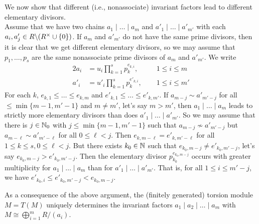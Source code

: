\documentclass[11pt]{book}
\theoremstyle{definition}   \newtheorem{defn}[counter]{Definition} %
\newcommand{\bs}{\backslash}   \newcommand{\A}{\mathcal{A}}   \newcommand{\sy}{\textnormal{Syl}}   \newcommand{\size}[1]{\left| #1 \right|}
\newcommand{\vs}{\vspace{8pt}}
\numberwithin{counter}{chapter}
\begin{document}
\begin{remark}[+ Discussion]
We now show that different (i.e., nonassociate) invariant factors lead to different elementary divisors. \\

Assume that we have two chains $a_1 \mid \dots \mid a_m$ and $a'_1 \mid \dots \mid a'_{m'}$ with each $a_i,a'_j \in R\bs(R\x \cup \{0\})$. If $a_m$ and $a'_{m'}$ do not have the same prime divisors, then it is clear that we get different elementary divisors, so we may assume that $p_1,\dots,p_s$ are the same nonassociate prime divisors of $a_m$ and $a'_{m'}$. We write
\begin{alignat*}{2}
a_i &= u_i \prod_{k=1}^s p_k ^{e_{k,i}}, \quad && 1 \leq i \leq m \\
a'_i &= u'_i \prod_{k=1}^s p_k^{e'_{k,i}}, && 1 \leq i \leq m'
\end{alignat*}
For each $k$, $e_{k,1} \leq \dots \leq e_{k,m}$ and $e'_{k,1} \leq \dots \leq e'_{k,m'}$. If $a_{m-j} \sim a'_{m'-j}$ for all $ \leq \min\{m-1,m'-1\}$ and $m \ne m'$, let's say $m > m'$, then $a_1 \mid \dots \mid a_m$ leads to strictly more elementary divisors than does $a'_1 \mid \dots \mid a'_{m'}$. So we may assume that there is $j \in \operatorname{\mathbb{N}}_0$ with $j \leq \min\{m-1,m'-1\}$ such that $a_{m-j} \nsim a'_{m'-j}$ but $a_{m-\ell} \sim a'_{m'-\ell}$ for all $0 \leq \ell < j$. Then $e_{k,m-\ell} = e'_{k,m'-\ell}$ for all $1 \leq k \leq s, 0 \leq \ell < j$. But there exists $k_0 \in \operatorname{\mathbb{N}}$ such that $e_{k_0,m-j} \ne e'_{k_0,m'-j}$, let's say $e_{k_0,m-j} > e'_{k_0,m'-j}$. Then the elementary divisor $p_{k_0}^{e_{k_0,m-j}}$ occurs with greater multiplicity for $a_1 \mid \dots \mid a_m$ than for $a'_1 \mid \dots \mid a'_{m'}$. That is, for all $1 \leq i \leq m'-j$, we have $e'_{k_0,i} \leq e'_{k_0,m'-j} < e_{k_0,m-j}$.

As a consequence of the above argument, the (finitely generated) torsion module $M = T(M)$ uniquely determines the invariant factors $a_1 \mid a_2 \mid \dots \mid a_m$ with $M \cong \bigoplus_{i=1}^m R/(a_i)$.

\end{remark}

\vs
\end{document}
